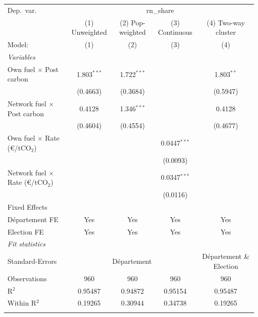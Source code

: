 \begingroup
\centering
\begin{tabular}{lcccc}
   \tabularnewline \midrule \midrule
   Dep.\ var. & \multicolumn{4}{c}{rn\_share}\\
                                                & (1) Unweighted & (2) Pop-weighted & (3) Continuous & (4) Two-way cluster \\   
   Model:                                       & (1)            & (2)              & (3)            & (4)\\  
   \midrule
   \emph{Variables}\\
   Own fuel $\times$ Post carbon                & 1.803$^{***}$  & 1.722$^{***}$    &                & 1.803$^{**}$\\   
                                                & (0.4663)       & (0.3684)         &                & (0.5947)\\   
   Network fuel $\times$ Post carbon            & 0.4128         & 1.346$^{***}$    &                & 0.4128\\   
                                                & (0.4604)       & (0.4554)         &                & (0.4677)\\   
   Own fuel $\times$ Rate (\euro/tCO$_2$)       &                &                  & 0.0447$^{***}$ &   \\   
                                                &                &                  & (0.0093)       &   \\   
   Network fuel $\times$ Rate (\euro/tCO$_2$)   &                &                  & 0.0347$^{***}$ &   \\   
                                                &                &                  & (0.0116)       &   \\   
   \midrule Fixed Effects\\
   D\'{e}partement FE                           & Yes            & Yes              & Yes            & Yes\\  
   Election FE                                  & Yes            & Yes              & Yes            & Yes\\  
   \midrule
   \emph{Fit statistics}\\
   Standard-Errors & \multicolumn{3}{c}{D\'{e}partement} & D\'{e}partement \& Election \\ 
   Observations                                 & 960            & 960              & 960            & 960\\  
   R$^2$                                        & 0.95487        & 0.94872          & 0.95154        & 0.95487\\  
   Within R$^2$                                 & 0.19265        & 0.30944          & 0.34738        & 0.19265\\  
   \midrule \midrule & \tabularnewline
\end{tabular}
\par\endgroup
